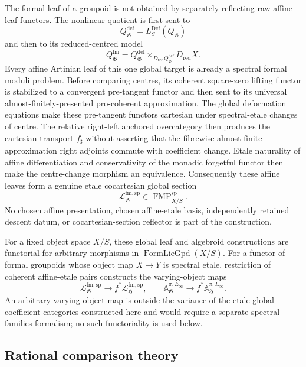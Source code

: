 The formal leaf of a groupoid is not obtained by separately reflecting raw
affine leaf functors.  The nonlinear quotient is first sent to
\[
    Q^{\mathrm{def}}_{\mathfrak G}
    =
    L^{\mathrm{Def}}_S(Q_{\mathfrak G})
\]
and then to its reduced-centred model
\[
    Q^{\mathrm{fm}}_{\mathfrak G}
    =
    Q^{\mathrm{def}}_{\mathfrak G}
    \times_{D_{\mathrm{red}}Q^{\mathrm{def}}_{\mathfrak G}}
    D_{\mathrm{red}}X.
\]
Every affine Artinian leaf of this one global target is already a spectral
formal moduli problem.  Before comparing centres, its coherent square-zero
lifting functor is stabilized to a convergent pre-tangent functor and then
sent to its universal almost-finitely-presented pro-coherent approximation.
The global deformation equations make these pre-tangent functors cartesian
under spectral-etale changes of centre.  The relative right-left anchored
overcategory then produces the cartesian transport $f_\sharp$ without
asserting that the fibrewise almost-finite approximation right adjoints commute
with coefficient change.  Etale naturality of affine differentiation and
conservativity of the monadic forgetful functor then make the centre-change
morphism an equivalence.  Consequently these affine leaves form a genuine
etale cocartesian global
section
\[
    \mathcal L^{\mathrm{fm,sp}}_{\mathfrak G}
    \in
    \operatorname{FMP}^{\mathrm{sp}}_{X/S}.
\]
No chosen affine presentation, chosen affine-etale basis, independently
retained descent datum, or cocartesian-section reflector is part of the
construction.

For a fixed object space $X/S$, these global leaf and algebroid constructions
are functorial for arbitrary morphisms in $\operatorname{FormLieGpd}(X/S)$.
For a functor of formal groupoids whose object map $X\to Y$ is spectral etale,
restriction of coherent affine-etale pairs constructs the varying-object maps
\[
    \mathcal L^{\mathrm{fm,sp}}_{\mathfrak G}
    \longrightarrow
    f^*\mathcal L^{\mathrm{fm,sp}}_{\mathfrak H},
    \qquad
    \mathbb A^{\pi,E_\infty}_{\mathfrak G}
    \longrightarrow
    f^*\mathbb A^{\pi,E_\infty}_{\mathfrak H}.
\]
An arbitrary varying-object map is outside the variance of the etale-global
coefficient categories constructed here and would require a separate spectral
families formalism; no such functoriality is used below.

\subsection{Rational comparison theory}

